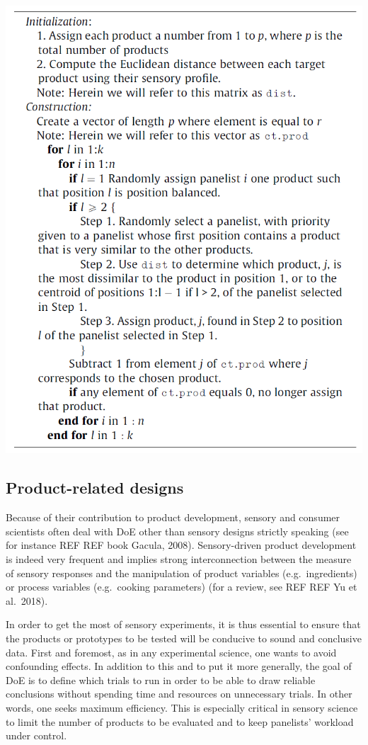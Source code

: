 \documentclass[
]{book}
\begin{document}
\begin{center}\includegraphics[width=10.57in]{images/sensory_doe} \end{center}

\hypertarget{product-related-designs}{%
\subsection{Product-related designs}\label{product-related-designs}}

Because of their contribution to product development, sensory and consumer scientists often deal with DoE other than sensory designs strictly speaking (see for instance REF REF book Gacula, 2008). Sensory-driven product development is indeed very frequent and implies strong interconnection between the measure of sensory responses and the manipulation of product variables (e.g.~ingredients) or process variables (e.g.~cooking parameters) (for a review, see REF REF Yu et al.~2018).

In order to get the most of sensory experiments, it is thus essential to ensure that the products or prototypes to be tested will be conducive to sound and conclusive data. First and foremost, as in any experimental science, one wants to avoid confounding effects. In addition to this and to put it more generally, the goal of DoE is to define which trials to run in order to be able to draw reliable conclusions without spending time and resources on unnecessary trials. In other words, one seeks maximum efficiency. This is especially critical in sensory science to limit the number of products to be evaluated and to keep panelists' workload under control.
\end{document}
